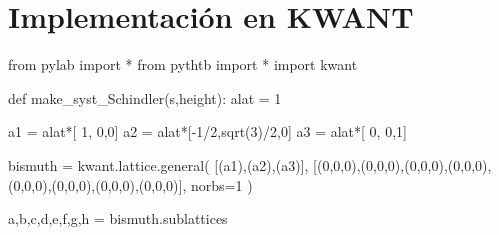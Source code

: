 \documentclass[
  letterpaper,
  DIV=11,
  numbers=noendperiod]{scrreprt}
\newenvironment{Shaded}{\begin{snugshade}}{\end{snugshade}}
\newcommand{\DecValTok}[1]{\textcolor[rgb]{0.68,0.00,0.00}{#1}}
\newcommand{\ImportTok}[1]{\textcolor[rgb]{0.00,0.46,0.62}{#1}}
\newcommand{\KeywordTok}[1]{\textcolor[rgb]{0.00,0.23,0.31}{#1}}
\newcommand{\NormalTok}[1]{\textcolor[rgb]{0.00,0.23,0.31}{#1}}
\newcommand{\OperatorTok}[1]{\textcolor[rgb]{0.37,0.37,0.37}{#1}}
\begin{document}
\hypertarget{implementaciuxf3n-en-kwant}{%
\section{Implementación en KWANT}\label{implementaciuxf3n-en-kwant}}

\begin{Shaded}
\begin{Highlighting}[]
\ImportTok{from}\NormalTok{ pylab }\ImportTok{import} \OperatorTok{*}
\ImportTok{from}\NormalTok{ pythtb }\ImportTok{import} \OperatorTok{*}
\ImportTok{import}\NormalTok{ kwant}


\KeywordTok{def}\NormalTok{ make\_syst\_Schindler(s,height):}
\NormalTok{    alat  }\OperatorTok{=} \DecValTok{1}

\NormalTok{    a1 }\OperatorTok{=}\NormalTok{ alat}\OperatorTok{*}\NormalTok{[   }\DecValTok{1}\NormalTok{,        }\DecValTok{0}\NormalTok{,}\DecValTok{0}\NormalTok{]}
\NormalTok{    a2 }\OperatorTok{=}\NormalTok{ alat}\OperatorTok{*}\NormalTok{[}\OperatorTok{{-}}\DecValTok{1}\OperatorTok{/}\DecValTok{2}\NormalTok{,sqrt(}\DecValTok{3}\NormalTok{)}\OperatorTok{/}\DecValTok{2}\NormalTok{,}\DecValTok{0}\NormalTok{]}
\NormalTok{    a3 }\OperatorTok{=}\NormalTok{ alat}\OperatorTok{*}\NormalTok{[   }\DecValTok{0}\NormalTok{,        }\DecValTok{0}\NormalTok{,}\DecValTok{1}\NormalTok{]}

\NormalTok{    bismuth }\OperatorTok{=}\NormalTok{ kwant.lattice.general( [(a1),(a2),(a3)], }
\NormalTok{                                 [(}\DecValTok{0}\NormalTok{,}\DecValTok{0}\NormalTok{,}\DecValTok{0}\NormalTok{),(}\DecValTok{0}\NormalTok{,}\DecValTok{0}\NormalTok{,}\DecValTok{0}\NormalTok{),(}\DecValTok{0}\NormalTok{,}\DecValTok{0}\NormalTok{,}\DecValTok{0}\NormalTok{),(}\DecValTok{0}\NormalTok{,}\DecValTok{0}\NormalTok{,}\DecValTok{0}\NormalTok{),(}\DecValTok{0}\NormalTok{,}\DecValTok{0}\NormalTok{,}\DecValTok{0}\NormalTok{),(}\DecValTok{0}\NormalTok{,}\DecValTok{0}\NormalTok{,}\DecValTok{0}\NormalTok{),(}\DecValTok{0}\NormalTok{,}\DecValTok{0}\NormalTok{,}\DecValTok{0}\NormalTok{),(}\DecValTok{0}\NormalTok{,}\DecValTok{0}\NormalTok{,}\DecValTok{0}\NormalTok{)],}
\NormalTok{                                  norbs}\OperatorTok{=}\DecValTok{1}\NormalTok{ )}
                
\NormalTok{    a,b,c,d,e,f,g,h }\OperatorTok{=}\NormalTok{ bismuth.sublattices}


\end{Highlighting}
\end{Shaded}
\end{document}
